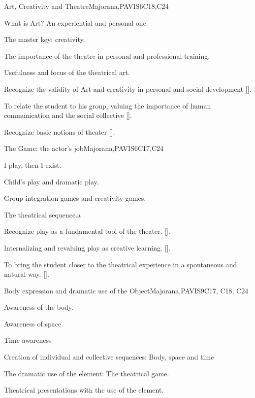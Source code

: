 \begin{syllabus}
\begin{unit}{}{Art, Creativity and Theatre}{Majorana,PAVIS}{6}{C18,C24}
\begin{topics}
	\item What is Art? An experiential and personal one.
	\item The master key: creativity.
	\item The importance of the theatre in personal and professional training.
	\item Usefulness and focus of the theatrical art.
\end{topics}
\begin{learningoutcomes}
	\item Recognize the validity of Art and creativity in personal and social development [\Usage].
	\item To relate the student to his group, valuing the importance of human communication and the social collective [\Usage].
	\item Recognize basic notions of theater [\Usage].
\end{learningoutcomes}
\end{unit}

\begin{unit}{}{The Game: the actor's job}{Majorana,PAVIS}{6}{C17,C24}
\begin{topics}
	\item I play, then I exist.
	\item Child's play and dramatic play.
	\item Group integration games and creativity games.
	\item The theatrical sequence.a
\end{topics}
\begin{learningoutcomes}
	\item Recognize play as a fundamental tool of the theater. [\Usage].
	\item Internalizing and revaluing play as creative learning. [\Usage].
	\item To bring the student closer to the theatrical experience in a spontaneous and natural way. [\Usage].
\end{learningoutcomes}
\end{unit}

\begin{unit}{}{Body expression and dramatic use of the Object}{Majorana,PAVIS}{9}{C17, C18, C24}
\begin{topics}
	\item Awareness of the body.
	\item Awareness of space
	\item Time awareness
	\item Creation of individual and collective sequences: Body, space and time
	\item The dramatic use of the element: The theatrical game.
	\item Theatrical presentations with the use of the element.


\end{topics}
\end{unit}
\end{syllabus}
